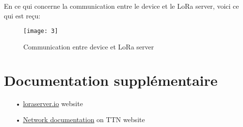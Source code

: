 En ce qui concerne la communication entre le device et le LoRa server, voici ce qui est reçu:

\vspace{2mm}
\begin{figure}[h!]
\centering
\texttt{[image: 3]}
\caption{Communication entre device et LoRa server}
\end{figure}

\section{Documentation supplémentaire}

\begin{itemize}
\item[•] \url{loraserver.io} website
\item[•] \href{https://www.thethingsnetwork.org/docs/network/}{Network documentation} on TTN website
\end{itemize}

